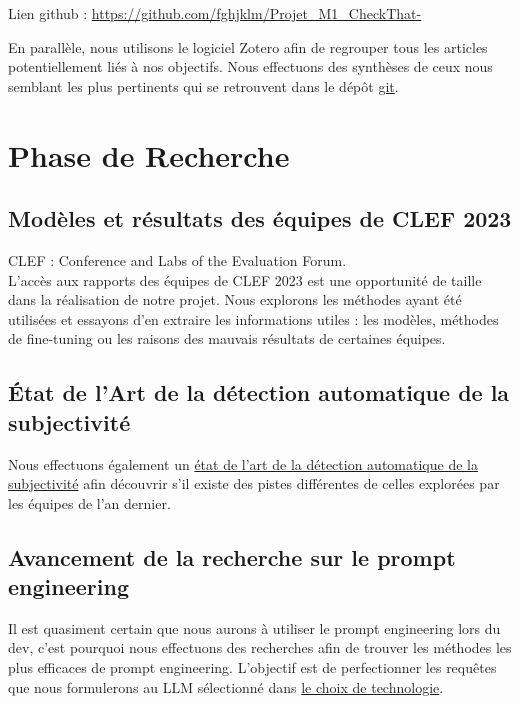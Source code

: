 \documentclass[11pt]{rapport_class}
\begin{document}
Lien github : \url{https://github.com/fghjklm/Projet_M1_CheckThat-}

En parallèle, nous utilisons le logiciel Zotero afin de regrouper tous les articles potentiellement liés à nos objectifs. Nous effectuons des synthèses de ceux nous semblant les plus pertinents qui se retrouvent dans le dépôt \href{https://github.com/fghjklm/Projet_M1_CheckThat-/tree/main/articles}{git}.


\chapter{Phase de Recherche}
\section{Modèles et résultats des équipes de CLEF 2023}
CLEF : Conference and Labs of the Evaluation Forum.\\
\vspace{0mm}
\qquad L'accès aux rapports des équipes de CLEF 2023 est une opportunité de taille dans la réalisation de notre projet. Nous explorons les méthodes ayant été utilisées et essayons d'en extraire les informations utiles : les modèles, méthodes de fine-tuning ou les raisons des mauvais résultats de certaines équipes.

\section{État de l'Art de la détection automatique de la subjectivité}
\qquad Nous effectuons également un \href{https://github.com/fghjklm/Projet_M1_CheckThat-/tree/main/articles}{état de l'art de la détection automatique de la subjectivité} afin découvrir s'il existe des pistes différentes de celles explorées par les équipes de l'an dernier.



\section{Avancement de la recherche sur le prompt engineering}
\qquad Il est quasiment certain que nous aurons à utiliser le prompt engineering lors du dev, c'est pourquoi nous effectuons des recherches afin de trouver les méthodes les plus efficaces de prompt engineering. L'objectif est de perfectionner les requêtes que nous formulerons au LLM sélectionné dans \href{https://github.com/fghjklm/Projet_M1_CheckThat-/tree/main/choix_techno}{le choix de technologie}.
\end{document}
